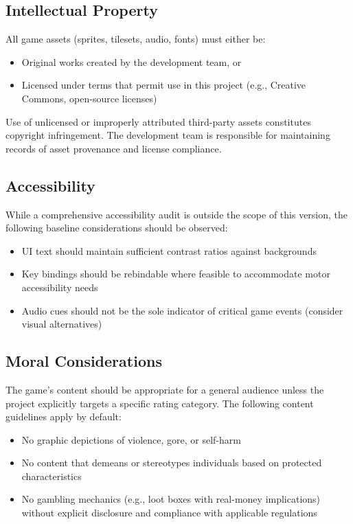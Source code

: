 \documentclass[12pt, letterpaper]{article}
\begin{document}
\subsection{Intellectual Property}

All game assets (sprites, tilesets, audio, fonts) must either be:

\begin{itemize}[noitemsep]
    \item Original works created by the development team, or
    \item Licensed under terms that permit use in this project (e.g., Creative Commons, open-source licenses)
\end{itemize}

Use of unlicensed or improperly attributed third-party assets constitutes copyright infringement. The development team is responsible for maintaining records of asset provenance and license compliance.

\subsection{Accessibility}

While a comprehensive accessibility audit is outside the scope of this version, the following baseline considerations should be observed:

\begin{itemize}[noitemsep]
    \item UI text should maintain sufficient contrast ratios against backgrounds
    \item Key bindings should be rebindable where feasible to accommodate motor accessibility needs
    \item Audio cues should not be the sole indicator of critical game events (consider visual alternatives)
\end{itemize}

\subsection{Moral Considerations}

The game's content should be appropriate for a general audience unless the project explicitly targets a specific rating category. The following content guidelines apply by default:

\begin{itemize}[noitemsep]
    \item No graphic depictions of violence, gore, or self-harm
    \item No content that demeans or stereotypes individuals based on protected characteristics
    \item No gambling mechanics (e.g., loot boxes with real-money implications) without explicit disclosure and compliance with applicable regulations
\end{itemize}
\end{document}
